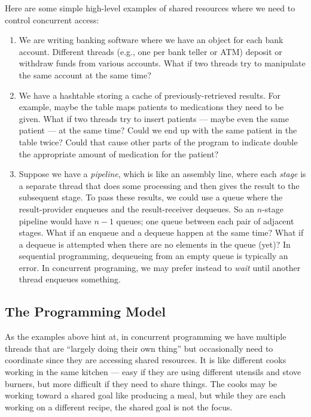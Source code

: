\documentclass[10pt]{article}
\begin{document}
Here are some simple high-level examples of shared resources where we
need to control concurrent access:
\begin{enumerate}
\item We are writing banking software where we have an object for each
  bank account.  Different threads (e.g., one per bank teller or ATM)
  deposit or withdraw funds from various accounts.  What if two
  threads try to manipulate the same account at the same time?
\item We have a hashtable storing a cache of previously-retrieved
  results.  For example, maybe the table maps patients to medications
  they need to be given.  What if two threads try to insert patients
  --- maybe even the same patient --- at the same time?  Could we end
  up with the same patient in the table twice?  Could that cause other
  parts of the program to indicate double the appropriate amount of
  medication for the patient?
\item Suppose we have a \emph{pipeline}, which is like an assembly
  line, where each \emph{stage} is a separate thread that does some
  processing and then gives the result to the subsequent stage.  To
  pass these results, we could use a queue where the result-provider
  enqueues and the result-receiver dequeues.  So an $n$-stage pipeline
  would have $n-1$ queues; one queue between each pair of adjacent
  stages.  What if an enqueue and a dequeue happen at the same time?
  What if a dequeue is attempted when there are no elements in the
  queue (yet)?  In sequential programming, dequeueing from an empty
  queue is typically an error.  In concurrent programing, we may
  prefer instead to \emph{wait} until another thread enqueues something.
\end{enumerate}

\subsection{The Programming Model}

As the examples above hint at, in concurrent programming we have
multiple threads that are ``largely doing their own thing'' but
occasionally need to coordinate since they are accessing shared
resources.  It is like different cooks working in the same kitchen ---
easy if they are using different utensils and stove burners, but more
difficult if they need to share things.  The cooks may be working
toward a shared goal like producing a meal, but while they are each
working on a different recipe, the shared goal is not the focus.
\end{document}
